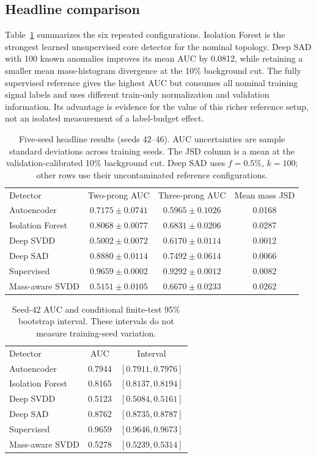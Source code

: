 \documentclass[reprint,aps,pra,amsmath,amssymb,floatfix,raggedbottom]{revtex4-2}
\begin{document}
\subsection{Headline comparison}
Table~\ref{tab:headline} summarizes the six repeated configurations. Isolation Forest is the strongest learned unsupervised core detector for the nominal topology. Deep SAD with 100 known anomalies improves its mean AUC by 0.0812, while retaining a smaller mean mass-histogram divergence at the 10\% background cut. The fully supervised reference gives the highest AUC but consumes all nominal training signal labels and uses different train-only normalization and validation information. Its advantage is evidence for the value of this richer reference setup, not an isolated measurement of a label-budget effect.

\begin{table}[tbp]
\caption{Five-seed headline results (seeds 42--46). AUC uncertainties are sample standard deviations across training seeds. The JSD column is a mean at the validation-calibrated 10\% background cut. Deep SAD uses $f=0.5\%$, $k=100$; other rows use their uncontaminated reference configurations.}\label{tab:headline}
\begin{ruledtabular}\begin{tabular}{lccc}
Detector & Two-prong AUC & Three-prong AUC & Mean mass JSD\\
Autoencoder & $0.7175\pm0.0741$ & $0.5965\pm0.1026$ & 0.0168\\
Isolation Forest & $0.8068\pm0.0077$ & $0.6831\pm0.0206$ & 0.0287\\
Deep SVDD & $0.5002\pm0.0072$ & $0.6170\pm0.0114$ & 0.0012\\
Deep SAD & $0.8880\pm0.0114$ & $0.7492\pm0.0614$ & 0.0066\\
Supervised & $0.9659\pm0.0002$ & $0.9292\pm0.0012$ & 0.0082\\
Mass-aware SVDD & $0.5151\pm0.0105$ & $0.6670\pm0.0233$ & 0.0262\\
\end{tabular}\end{ruledtabular}
\end{table}

\begin{table}[tbp]
\caption{Seed-42 AUC and conditional finite-test 95\% bootstrap interval. These intervals do not measure training-seed variation.}\label{tab:bootstrap}
\begin{ruledtabular}\begin{tabular}{lcc}
Detector & AUC & Interval\\
Autoencoder & 0.7944 & $[0.7911,0.7976]$\\
Isolation Forest & 0.8165 & $[0.8137,0.8194]$\\
Deep SVDD & 0.5123 & $[0.5084,0.5161]$\\
Deep SAD & 0.8762 & $[0.8735,0.8787]$\\
Supervised & 0.9659 & $[0.9646,0.9673]$\\
Mass-aware SVDD & 0.5278 & $[0.5239,0.5314]$\\
\end{tabular}\end{ruledtabular}
\end{table}
\end{document}
